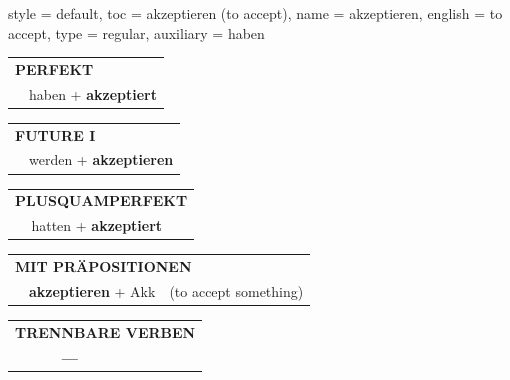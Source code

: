 \begin{verbentry}{
  style = {default},
  toc = {akzeptieren (to accept)},
  name = {akzeptieren},
  english = {to accept},
  type = {regular},
  auxiliary = {haben}
}
\vspace{10pt}

\begin{tabular}{rl}
\multicolumn{2}{l}{\textbf{PERFEKT}}\\
& haben + \textbf{akzeptiert}\\
\end{tabular}
\hfill
\begin{tabular}{rl}
\multicolumn{2}{l}{\textbf{FUTURE I}}\\
& werden + \textbf{akzeptieren}\\
\end{tabular}
\hfill
\begin{tabular}{rl}
\multicolumn{2}{l}{\textbf{PLUSQUAMPERFEKT}}\\
& hatten + \textbf{akzeptiert}\\
\end{tabular}

\vspace{10pt}

\begin{tabular}{lll}
\multicolumn{3}{l}{\textbf{MIT PRÄPOSITIONEN}}\\
& \textbf{akzeptieren} + Akk & (to accept something)\\
\end{tabular}
\hfill
\begin{tabular}{lll}
\multicolumn{3}{l}{\textbf{TRENNBARE VERBEN}}\\
& \textbf{---} & \\
\end{tabular}

\vspace{-5pt}
\end{verbentry}

